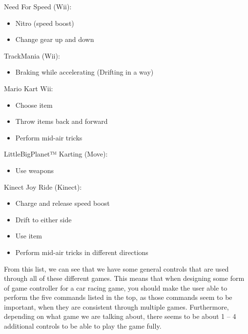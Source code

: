 Need For Speed (Wii):
\begin{itemize}
\item Nitro (speed boost)
\item Change gear up and down
\end{itemize}

TrackMania (Wii):
\begin{itemize}
\item Braking while accelerating (Drifting in a way)
\end{itemize}

Mario Kart Wii:
\begin{itemize}
\item Choose item
\item Throw items back and forward
\item Perform mid-air tricks
\end{itemize}

LittleBigPlanet™ Karting (Move):
\begin{itemize}
\item Use weapons
\end{itemize}

Kinect Joy Ride (Kinect):
\begin{itemize}
\item Charge and release speed boost
\item Drift to either side
\item Use item
\item Perform mid-air tricks in different directions
\end{itemize}

From this list, we can see that we have some general controls that are used through all of these different games. This means that when designing some form of game controller for a car racing game, you should make the user able to perform the five commands listed in the top, as those commands seem to be important, when they are consistent through multiple games. Furthermore, depending on what game we are talking about, there seems to be about 1 – 4 additional controls to be able to play the game fully.

